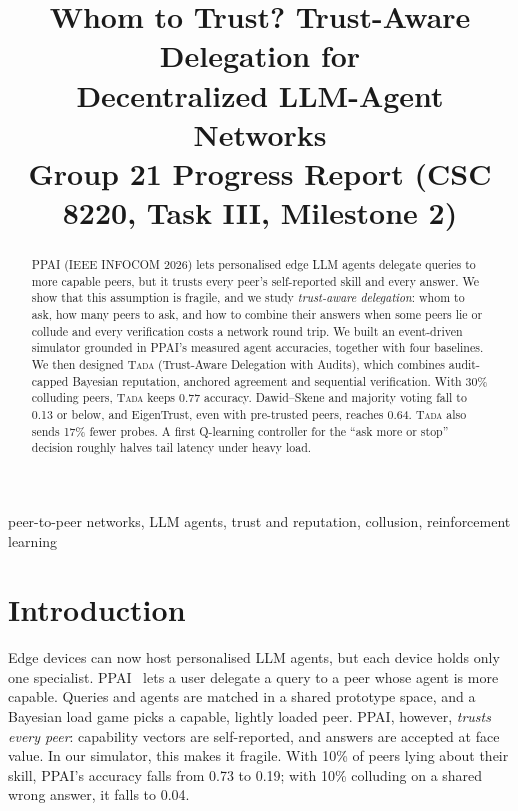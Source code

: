 \documentclass[conference]{IEEEtran}
\newcommand{\tada}{\textup{\textsc{Tada}}}
\begin{document}
\title{Whom to Trust? Trust-Aware Delegation for\\Decentralized LLM-Agent Networks\\
{\large Group 21 Progress Report (CSC 8220, Task III, Milestone 2)}}

\author{
\and
{}
}

\maketitle

\begin{abstract}
PPAI (IEEE INFOCOM 2026) lets personalised edge LLM agents delegate queries to more capable peers,
but it trusts every peer's self-reported skill and every answer. We show that this assumption is
fragile, and we study \emph{trust-aware delegation}: whom to ask, how many peers to ask, and how to
combine their answers when some peers lie or collude and every verification costs a network round
trip. We built an event-driven simulator grounded in PPAI's measured agent accuracies, together with
four baselines. We then designed \tada{} (Trust-Aware Delegation with Audits), which combines
audit-capped Bayesian reputation, anchored agreement and sequential verification. With 30\%
colluding peers, \tada{} keeps 0.77 accuracy. Dawid--Skene and majority voting fall to 0.13 or
below, and EigenTrust, even with pre-trusted peers, reaches 0.64. \tada{} also sends 17\% fewer probes.
A first Q-learning controller for the ``ask more or stop'' decision roughly halves tail latency
under heavy load.
\end{abstract}

\begin{IEEEkeywords}
peer-to-peer networks, LLM agents, trust and reputation, collusion, reinforcement learning
\end{IEEEkeywords}

\section{Introduction}
Edge devices can now host personalised LLM agents, but each device holds only one specialist.
PPAI~\cite{ppai} lets a user delegate a query to a peer whose agent is more capable. Queries and
agents are matched in a shared prototype space, and a Bayesian load game picks a capable, lightly
loaded peer. PPAI, however, \emph{trusts every peer}: capability vectors are self-reported, and
answers are accepted at face value. In our simulator, this makes it fragile. With 10\% of peers
lying about their skill, PPAI's accuracy falls from 0.73 to 0.19; with 10\% colluding on a shared
wrong answer, it falls to 0.04.
\end{document}
